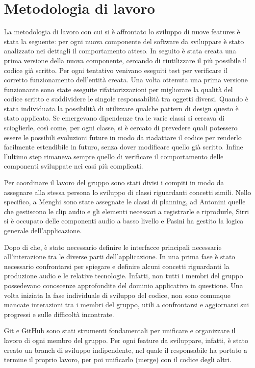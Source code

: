 \documentclass[a4paper,12pt]{report}
\begin{document}
\section{Metodologia di lavoro}
La metodologia di lavoro con cui si è affrontato lo sviluppo di nuove features è stata la seguente: per ogni nuova componente del software da sviluppare è stato analizzato nei dettagli il comportamento atteso.
In seguito è stata creata una prima versione della nuova componente, cercando di riutilizzare il più possibile il codice già scritto.
Per ogni tentativo venivano eseguiti test per verificare il corretto funzionamento dell’entità creata. 
Una volta ottenuta una prima versione funzionante sono state eseguite rifattorizzazioni per migliorare la qualità del codice scritto e suddividere le singole responsabilità tra oggetti diversi. Quando è stata individuata la possibilità di utilizzare qualche pattern di design questo è stato applicato.
Se emergevano dipendenze tra le varie classi si cercava di scioglierle, così come, per ogni classe, si è cercato di prevedere quali potessero essere le possibili evoluzioni future in modo da riadattare il codice per renderlo facilmente estendibile in futuro, senza dover modificare quello già scritto.
Infine l’ultimo step rimaneva sempre quello di verificare il comportamento delle componenti sviluppate nei casi più complicati.

Per coordinare il lavoro del gruppo sono stati divisi i compiti in modo da assegnare alla stessa persona lo sviluppo di classi riguardanti concetti simili. Nello specifico, a Menghi sono state assegnate le classi di planning, ad Antonini quelle che gestiscono le clip audio e gli elementi necessari a registrarle e riprodurle, Sirri si è occupato delle componenti audio a basso livello e Pasini ha gestito la logica generale dell'applicazione.

Dopo di che, è stato necessario definire le interfacce principali necessarie all’interazione tra le diverse parti dell’applicazione.
In una prima fase è stato necessario confrontarsi per spiegare e definire alcuni concetti riguardanti la produzione audio e le relative tecnologie. Infatti, non tutti i membri del gruppo possedevano conoscenze approfondite del dominio applicativo in questione. 
Una volta iniziata la fase individuale di sviluppo del codice, non sono comunque mancate interazioni tra i membri del gruppo, utili a confrontarsi e aggiornarsi sui progressi e sulle difficoltà incontrate.

Git e GitHub sono stati strumenti fondamentali per unificare e organizzare il lavoro di ogni membro del gruppo. Per ogni feature da sviluppare, infatti, è stato creato un branch di sviluppo indipendente, nel quale il responsabile ha portato a termine il proprio lavoro, per poi unificarlo (merge) con il codice degli altri. 
\end{document}
